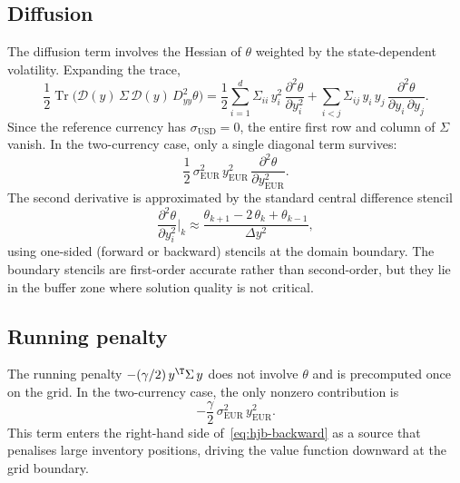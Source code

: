 \subsection{Diffusion}
\label{sec:pde-diffusion}

The diffusion term involves the Hessian of $\theta$ weighted by the state-dependent volatility. Expanding the trace,
\begin{equation}
  \label{eq:diffusion-expanded}
  \frac{1}{2}\operatorname{Tr}\!\bigl(\mathcal{D}(y)\,\Sigma\,\mathcal{D}(y)\,D^2_{yy}\theta\bigr)
  = \frac{1}{2}\sum_{i=1}^d \Sigma_{ii}\,y_i^2\,\frac{\partial^2\theta}{\partial y_i^2}
  + \sum_{i < j} \Sigma_{ij}\,y_i\,y_j\,\frac{\partial^2\theta}{\partial y_i\,\partial y_j}.
\end{equation}
Since the reference currency has $\sigma_{\text{USD}} = 0$, the entire first row and column of $\Sigma$ vanish. In the two-currency case, only a single diagonal term survives:
\begin{equation}
  \label{eq:diffusion-2ccy}
  \frac{1}{2}\,\sigma_{\text{EUR}}^2\,y_{\text{EUR}}^2\,\frac{\partial^2\theta}{\partial y_{\text{EUR}}^2}.
\end{equation}
The second derivative is approximated by the standard central difference stencil
\begin{equation}
  \label{eq:central-2nd}
  \frac{\partial^2\theta}{\partial y_i^2}\bigg|_k \approx \frac{\theta_{k+1} - 2\,\theta_k + \theta_{k-1}}{\Delta y^2},
\end{equation}
using one-sided (forward or backward) stencils at the domain boundary. The boundary stencils are first-order accurate rather than second-order, but they lie in the buffer zone where solution quality is not critical.


\subsection{Running penalty}
\label{sec:pde-penalty}

The running penalty $-(\gamma/2)\,y^\T \Sigma\, y$ does not involve $\theta$ and is precomputed once on the grid. In the two-currency case, the only nonzero contribution is
\begin{equation}
  -\frac{\gamma}{2}\,\sigma_{\text{EUR}}^2\,y_{\text{EUR}}^2.
\end{equation}
This term enters the right-hand side of~\eqref{eq:hjb-backward} as a source that penalises large inventory positions, driving the value function downward at the grid boundary.


